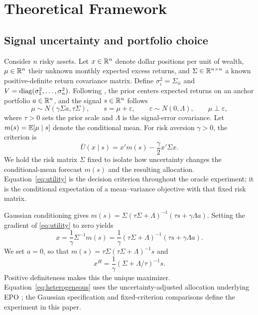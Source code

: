 \section{Theoretical Framework}
\label{sec:framework}
\subsection{Signal uncertainty and portfolio choice}
Consider $n$ risky assets. Let $x\in\mathbb{R}^n$ denote dollar positions per unit of wealth, $\mu\in\mathbb{R}^n$ their unknown monthly expected excess returns, and $\Sigma\in\mathbb{R}^{n\times n}$ a known positive-definite return covariance matrix. Define $\sigma_i^2=\Sigma_{ii}$ and $V=\operatorname{diag}(\sigma_1^2,\ldots,\sigma_n^2)$. Following \citet{pedersen2021}, the prior centers expected returns on an anchor portfolio $a\in\mathbb{R}^n$, and the signal $s\in\mathbb{R}^n$ follows
\begin{equation}
\mu\sim N(\gamma\Sigma a,\tau\Sigma),\qquad s=\mu+\varepsilon,\qquad
\varepsilon\sim N(0,\Lambda),\qquad \mu\perp\varepsilon,
\label{eq:model}
\end{equation}
where $\tau>0$ sets the prior scale and $\Lambda$ is the signal-error covariance. Let $m(s)=\mathbb{E}[\mu\mid s]$ denote the conditional mean. For risk aversion $\gamma>0$, the criterion is
\begin{equation}
\bar U(x\mid s)=x'm(s)-\frac{\gamma}{2}x'\Sigma x.
\label{eq:utility}
\end{equation}
We hold the risk matrix $\Sigma$ fixed to isolate how uncertainty changes the conditional-mean forecast $m(s)$ and the resulting allocation. Equation~\eqref{eq:utility} is the decision criterion throughout the oracle experiment; it is the conditional expectation of a mean--variance objective with that fixed risk matrix.

Gaussian conditioning gives $m(s)=\Sigma(\tau\Sigma+\Lambda)^{-1}(\tau s+\gamma\Lambda a)$. Setting the gradient of \eqref{eq:utility} to zero yields
\begin{equation}
x=\frac{1}{\gamma}\Sigma^{-1}m(s)
=\frac{1}{\gamma}(\tau\Sigma+\Lambda)^{-1}(\tau s+\gamma\Lambda a).
\label{eq:anchor}
\end{equation}
We set $a=0$, so that $m(s)=\tau\Sigma(\tau\Sigma+\Lambda)^{-1}s$ and
\begin{equation}
x^H=\frac{1}{\gamma}(\Sigma+\Lambda/\tau)^{-1}s.
\label{eq:heterogeneous}
\end{equation}
Positive definiteness makes this the unique maximizer. Equation~\eqref{eq:heterogeneous} uses the uncertainty-adjusted allocation underlying EPO \citep{pedersen2021}; the Gaussian specification and fixed-criterion comparisons define the experiment in this paper.

